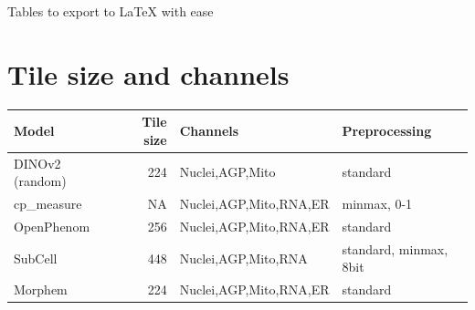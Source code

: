 \documentclass{extarticle}
\author{Alán F. Muñoz}
\date{\today}
\title{}
\begin{document}
\tableofcontents

Tables to export to \LaTeX{} with ease
\section{Tile size and channels}
\label{sec:org376dd89}
\begin{center}
\begin{tabular}{lrll}
Model & Tile size & Channels & Preprocessing\\
\hline
DINOv2 (random) & 224 & Nuclei,AGP,Mito & standard\\
cp\_measure & NA & Nuclei,AGP,Mito,RNA,ER & minmax, 0-1\\
OpenPhenom & 256 & Nuclei,AGP,Mito,RNA,ER & standard\\
SubCell & 448 & Nuclei,AGP,Mito,RNA & standard, minmax, 8bit\\
Morphem & 224 & Nuclei,AGP,Mito,RNA,ER & standard\\
\end{tabular}

\end{center}
\end{document}
